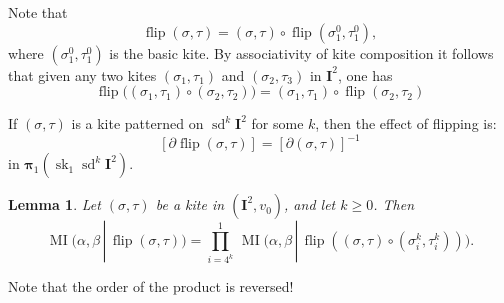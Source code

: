 \documentclass[10pt, a4paper]{amsart}
\newtheorem{lem}[equation]{Lemma}
\theoremstyle{definition}
\numberwithin{equation}{section}
\newcommand{\opn}{\operatorname}
\newcommand{\mbf}[1]{\mathbf{#1}}
\newcommand{\bsym}[1]{\boldsymbol{#1}}
\renewcommand{\vert}{\, | \,}
\begin{document}
Note that 
\[ \opn{flip} (\sigma, \tau) 
= (\sigma, \tau) \circ \opn{flip} (\sigma^{0}_1, \tau^{0}_1) , \] 
where $(\sigma^{0}_1, \tau^{0}_1)$ is the basic kite. 
By associativity of kite composition it follows that given any two kites
$(\sigma_1, \tau_1)$ and $(\sigma_2, \tau_3)$ in $\mbf{I}^{2}$, one has
\begin{equation} \label{eqn:55}
\opn{flip} \bigl( (\sigma_1, \tau_1) \circ (\sigma_2, \tau_2) \bigr)
= (\sigma_1, \tau_1) \circ \opn{flip} (\sigma_2, \tau_2)
\end{equation}

If  $(\sigma, \tau)$ is a kite patterned on $\opn{sd}^k \mbf{I}^2$ for
some $k$, then the effect of flipping is:
\begin{equation} \label{eqn:177}
[ \partial \opn{flip}(\sigma, \tau) ] =  [ \partial (\sigma, \tau) ]^{-1}
\end{equation}
in $\bsym{\pi}_1(\opn{sk}_1 \opn{sd}^k \mbf{I}^2)$.

\begin{lem} \label{lem:41}
Let $(\sigma, \tau)$ be a kite in $(\mbf{I}^2, v_0)$, and let 
$k \geq 0$. Then 
\begin{equation} \label{eqn:178}
\opn{MI} \bigl( \alpha, \beta \vert \opn{flip}(\sigma, \tau) \bigr) = 
\prod_{i = 4^k}^1 \, 
\opn{MI} \bigl( \alpha, \beta \vert \opn{flip}( (\sigma, \tau) \circ 
(\sigma^k_i, \tau^k_i) ) \bigr) .
\end{equation}
\end{lem}

Note that the order of the product is reversed!
\end{document}
